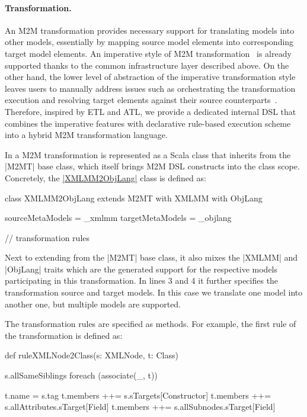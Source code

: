 \paragraph{Transformation.}
%
An M2M transformation provides necessary support for translating models into other models, essentially by mapping source model elements into corresponding target model elements.
An imperative style of M2M transformation~\cite{Czarnecki2006} is already supported thanks to the common infrastructure layer described above.
On the other hand, the lower level of abstraction of the imperative transformation style leaves users to manually address issues such as orchestrating the transformation execution and resolving target elements against their source counterparts~\cite{Kolovos2008a}.
Therefore, inspired by ETL and ATL, we provide a dedicated internal DSL that combines the imperative features with declarative rule-based execution scheme into a hybrid M2M transformation language.

In \SIGMA a M2M transformation is represented as a Scala class that inherits from the \Scala|M2MT| base class, which itself brings M2M DSL constructs into the class scope.
Concretely, the \href{https://github.com/fikovnik/ttc14-fixml-sigma/blob/master/ttc14-fixml-base/src/fr/inria/spirals/sigma/ttc14/fixml/XMLMM2ObjLang.scala}{\Scala|XMLMM2ObjLang|} class is defined as:
%
\begin{scalacode}
class XMLMM2ObjLang extends M2MT with XMLMM with ObjLang {

  sourceMetaModels = _xmlmm
  targetMetaModels = _objlang

  // transformation rules
}  
\end{scalacode}
%
Next to extending from the \Scala|M2MT| base class, it also mixes the \Scala|XMLMM| and \Scala|ObjLang| traits which are the generated support for the respective models participating in this transformation.
In lines 3 and 4 it further specifies the transformation source and target models.
In this case we translate one model into another one, but multiple models are supported.

The transformation rules are specified as methods.
For example, the first rule of the transformation is defined as:
%
\begin{scalacode}
def ruleXMLNode2Class(s: XMLNode, t: Class) {
  s.allSameSiblings foreach (associate(_, t))

  t.name = s.tag
  t.members ++= s.sTargets[Constructor]
  t.members ++= s.allAttributes.sTarget[Field]
  t.members ++= s.allSubnodes.sTarget[Field]
}
\end{scalacode}

